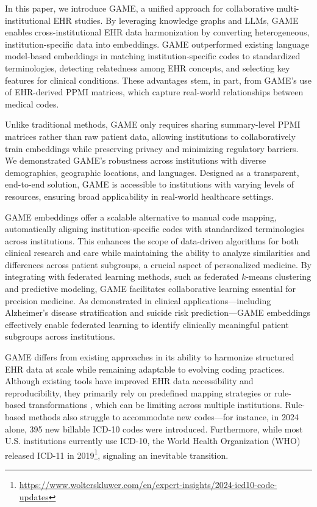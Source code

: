 \documentclass{article}
\begin{document}
In this paper, we introduce GAME, a unified approach for collaborative multi-institutional EHR studies. By leveraging knowledge graphs and LLMs, GAME enables cross-institutional EHR data harmonization by converting heterogeneous, institution-specific data into embeddings. GAME outperformed existing language model-based embeddings in matching institution-specific codes to standardized terminologies, detecting relatedness among EHR concepts, and selecting key features for clinical conditions. These advantages stem, in part, from GAME’s use of EHR-derived PPMI matrices, which capture real-world relationships between medical codes. 

Unlike traditional methods, GAME only requires sharing summary-level PPMI matrices rather than raw patient data, allowing institutions to collaboratively train embeddings while preserving privacy and minimizing regulatory barriers. We demonstrated GAME’s robustness across institutions with diverse demographics, geographic locations, and languages. Designed as a transparent, end-to-end solution, GAME is accessible to institutions with varying levels of resources, ensuring broad applicability in real-world healthcare settings.

GAME embeddings offer a scalable alternative to manual code mapping, automatically aligning institution-specific codes with standardized terminologies across institutions. This enhances the scope of data-driven algorithms for both clinical research and care while maintaining the ability to analyze similarities and differences across patient subgroups, a crucial aspect of personalized medicine. By integrating with federated learning methods, such as federated $k$-means clustering and predictive modeling, GAME facilitates collaborative learning essential for precision medicine. As demonstrated in clinical applications—including Alzheimer’s disease stratification and suicide risk prediction—GAME embeddings effectively enable federated learning to identify clinically meaningful patient subgroups across institutions.


GAME differs from existing approaches in its ability to harmonize structured EHR data at scale while remaining adaptable to evolving coding practices. Although existing tools have improved EHR data accessibility and reproducibility, they primarily rely on predefined mapping strategies or rule-based transformations \cite{heumos2024open}, which can be limiting across multiple institutions. Rule-based methods also struggle to accommodate new codes—for instance, in 2024 alone, 395 new billable ICD-10 codes were introduced. Furthermore, while most U.S. institutions currently use ICD-10, the World Health Organization (WHO) released ICD-11 in 2019\footnote{\url{https://www.wolterskluwer.com/en/expert-insights/2024-icd10-code-updates}}, signaling an inevitable transition.
\end{document}
